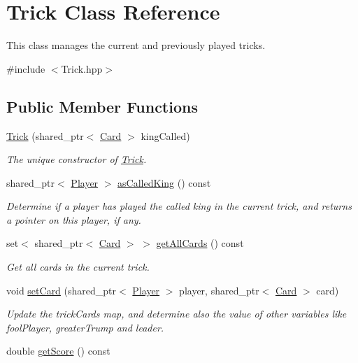 \hypertarget{classTrick}{\section{\-Trick \-Class \-Reference}
\label{classTrick}
}


\-This class manages the current and previously played tricks.  




{\ttfamily \#include $<$\-Trick.\-hpp$>$}

\subsection*{\-Public \-Member \-Functions}
\begin{DoxyCompactItemize}
\item 
\hyperlink{classTrick_a2d52be4c67d65793531d2dc96122ae72}{\-Trick} (shared\-\_\-ptr$<$ \hyperlink{classCard}{\-Card} $>$ king\-Called)
\begin{DoxyCompactList}\small\item\em \-The unique constructor of \hyperlink{classTrick}{\-Trick}. \end{DoxyCompactList}\item 
\hypertarget{classTrick_a4d196a8097feccd87f1aca65ea4e80c8}{shared\-\_\-ptr$<$ \hyperlink{classPlayer}{\-Player} $>$ \hyperlink{classTrick_a4d196a8097feccd87f1aca65ea4e80c8}{as\-Called\-King} () const }\label{classTrick_a4d196a8097feccd87f1aca65ea4e80c8}

\begin{DoxyCompactList}\small\item\em \-Determine if a player has played the called king in the current trick, and returns a pointer on this player, if any. \end{DoxyCompactList}\item 
\hypertarget{classTrick_a1db9b6c13def25e38b6604b56d97ddd2}{set$<$ shared\-\_\-ptr$<$ \hyperlink{classCard}{\-Card} $>$ $>$ \hyperlink{classTrick_a1db9b6c13def25e38b6604b56d97ddd2}{get\-All\-Cards} () const }\label{classTrick_a1db9b6c13def25e38b6604b56d97ddd2}

\begin{DoxyCompactList}\small\item\em \-Get all cards in the current trick. \end{DoxyCompactList}\item 
void \hyperlink{classTrick_a4d2b4c09c8d7c255ff34bde5fe29532a}{set\-Card} (shared\-\_\-ptr$<$ \hyperlink{classPlayer}{\-Player} $>$ player, shared\-\_\-ptr$<$ \hyperlink{classCard}{\-Card} $>$ card)
\begin{DoxyCompactList}\small\item\em \-Update the trick\-Cards map, and determine also the value of other variables like fool\-Player, greater\-Trump and leader. \end{DoxyCompactList}\item 
\hypertarget{classTrick_a63625303ef93e30fec915b8cd039e6af}{double \hyperlink{classTrick_a63625303ef93e30fec915b8cd039e6af}{get\-Score} () const }\label{classTrick_a63625303ef93e30fec915b8cd039e6af}


\end{DoxyCompactItemize}
